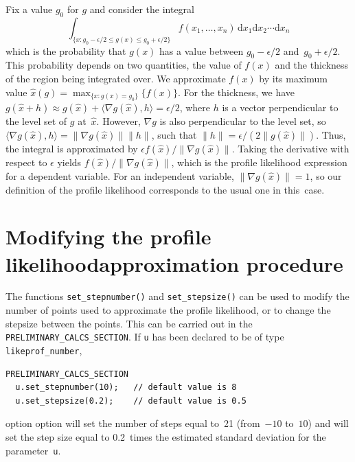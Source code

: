 \documentclass{admbmanual}
\newcommand\PCS{\texttt{PRELIMINARY\_CALCS\_SECTION}}
\newcommand\apl{profile likelihood}
\begin{document}
Fix a value $g_0$ for $g$ and consider the integral
$$\int_{\{x:g_0-\epsilon/2\le g(x)\le g_0+\epsilon/2\}} f(x_1,\ldots, x_n)
  \,\textrm{d}x_1\textrm{d}x_2\cdots \textrm{d}x_n$$
which is the probability that $g(x)$ has a value between 
$g_0-\epsilon/2$ and~$g_0+\epsilon/2$. This probability depends 
on two quantities,
the value of $f(x)$ and the thickness of the region being integrated over.
We approximate $f(x)$ by its maximum value 
$\hat x(g)=\max_{\{x:g(x)=g_0\}} \{f(x)\}$. For the thickness, we have
$g(\hat x+h)\approx g(\hat x)+\langle\nabla g(\hat x),h\rangle=\epsilon/2$, where
$h$ is a vector perpendicular to the level set of $g$ at~$\hat x$.
However,
$\nabla g$ is also perpendicular to the level set, so 
$\langle\nabla g(\hat x),h\rangle=\|\nabla g(\hat x)\| \|h\|$, such that 
$ \|h\|=\epsilon/(2\|g(\hat x)\|)$. Thus, the integral is approximated by
 $\epsilon f(\hat x)/\|\nabla g(\hat x)\|$. Taking the derivative
with respect to $\epsilon$ yields 
$f(\hat x)/\|\nabla g(\hat x)\|$, which is the profile likelihood expression
for a dependent variable.
For an independent variable, $\|\nabla g(\hat x)\|=1$, so our 
definition of 
the profile likelihood corresponds to the usual one in this~case.

 
\section{Modifying the profile likelihood\br approximation procedure}

The functions  \texttt{set\_stepnumber()} and 
\texttt{set\_stepsize()} can be used to modify the number of
points used to approximate the \apl, or to change
the stepsize between the points. This can be carried out in the
 \PCS. If \texttt{u} has been declared to be of type \texttt{likeprof\_number},
\begin{lstlisting}
PRELIMINARY_CALCS_SECTION
  u.set_stepnumber(10);   // default value is 8
  u.set_stepsize(0.2);    // default value is 0.5
\end{lstlisting}
 { option}
 { option}
will set the number of steps
equal to~21 (from~$-10$ to~$10$) and 
will set the step size equal to 0.2~times the estimated standard
deviation for the parameter~\texttt{u}.
\end{document}
